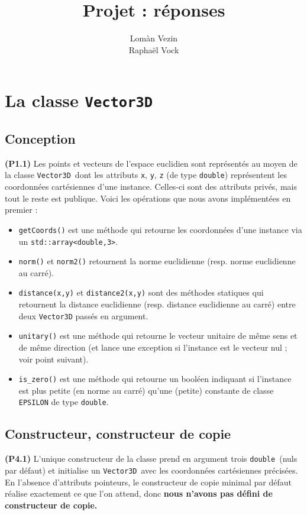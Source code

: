 \documentclass[12pt, letterpaper, twoside]{article}
\title{Projet : réponses}
\author{Lomàn Vezin \\ Raphaël Vock}
\newcommand{\T}[1]{\texttt{#1}}
\newcommand{\V}[0]{\texttt{Vector3D}}
\newcommand{\double}{\texttt{double}}
\begin{document}
\maketitle
\section{La classe \T{Vector3D}}
\subsection{Conception}
\noindent \textbf{(P1.1)} Les points et vecteurs de l'espace euclidien sont représentés au moyen de la classe \V\ dont les attributs \T{x}, \T{y}, \T{z} (de type \double) représentent les coordonnées cartésiennes d'une instance. Celles-ci sont des attributs privés, mais tout le reste est publique. Voici les opérations que nous avons implémentées en premier :

\begin{itemize}

\item \T{getCoords()} est une méthode qui retourne les coordonnées d'une instance via un \T{std::array<double,3>}.

\item \T{norm()} et \T{norm2()} retournent la norme euclidienne (resp. norme euclidienne au carré).

\item \T{distance(x,y)} et \T{distance2(x,y)} sont des méthodes statiques qui retournent la distance euclidienne (resp. distance euclidienne au carré) entre deux \T{Vector3D} passés en argument.

\item \T{unitary()} est une méthode qui retourne le vecteur unitaire de même sens et de même direction (et lance une exception si l'instance est le vecteur nul ; voir point suivant).

\item \T{is\_zero()} est une méthode qui retourne un booléen indiquant si l'instance est plus petite (en norme au carré) qu'une (petite) constante de classe \T{EPSILON} de type \double.
\end{itemize}

\subsection{Constructeur, constructeur de copie}
\noindent \textbf{(P4.1)} L'unique constructeur de la classe prend en argument trois \double\ (nuls par défaut) et initialise un \V\ avec les coordonnées cartésiennes précisées. En l'absence d'attributs pointeurs, le constructeur de copie minimal par défaut réalise exactement ce que l'on attend, donc \textbf{nous n'avons pas défini de constructeur de copie.}
\end{document}
